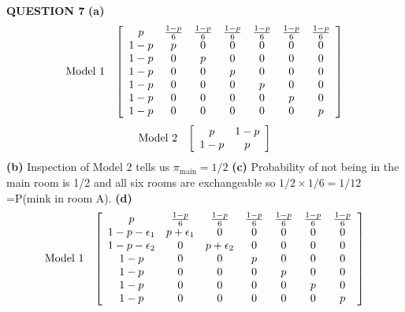 \documentclass{amsart}
\theoremstyle{definition}
\theoremstyle{remark}
\numberwithin{equation}{section}
\begin{document}
\bigskip
{\bf QUESTION 7}
\newline
{\bf (a)}
\begin{eqnarray}
\nonumber \text{Model 1} &&\left[
\begin{array}[4]{ccccccc}
p & \frac{1-p}{6} & \frac{1-p}{6} & \frac{1-p}{6} & \frac{1-p}{6} & \frac{1-p}{6} & \frac{1-p}{6}  \\
1-p & p & 0 & 0 & 0 & 0 & 0 \\
1-p & 0 & p & 0 & 0 & 0 & 0 \\
1-p & 0 & 0 & p & 0 & 0 & 0 \\
1-p & 0 & 0 & 0 & p & 0 & 0 \\
1-p & 0 & 0 & 0 & 0 & p & 0 \\
1-p & 0 & 0 & 0 & 0 & 0 & p \\
\end{array}
\right]
\end{eqnarray}
\begin{eqnarray}
\nonumber \text{Model 2} &&\left[
\begin{array}[4]{cc}
p & 1-p  \\
1-p & p \\
\end{array}
\right]
\end{eqnarray}
\newline
{\bf (b)} Inspection of Model 2 tells us $\pi_{\text{main}}=1/2$
\newline
{\bf (c)} Probability of not being in the main room is 1/2 and all
six rooms are exchangeable so $1/2 \times 1/6 = 1/12$=P(mink in
room A). \newline
{\bf(d)}
\begin{eqnarray}
\nonumber \text{Model 1} &&\left[
\begin{array}[4]{ccccccc}
p & \frac{1-p}{6} & \frac{1-p}{6} & \frac{1-p}{6} & \frac{1-p}{6} & \frac{1-p}{6} & \frac{1-p}{6}  \\
1-p-\epsilon_1 & p+\epsilon_1 & 0 & 0 & 0 & 0 & 0 \\
1-p-\epsilon_2 & 0 & p+\epsilon_2 & 0 & 0 & 0 & 0 \\
1-p & 0 & 0 & p & 0 & 0 & 0 \\
1-p & 0 & 0 & 0 & p & 0 & 0 \\
1-p & 0 & 0 & 0 & 0 & p & 0 \\
1-p & 0 & 0 & 0 & 0 & 0 & p \\
\end{array}
\right]
\end{eqnarray}
\end{document}

